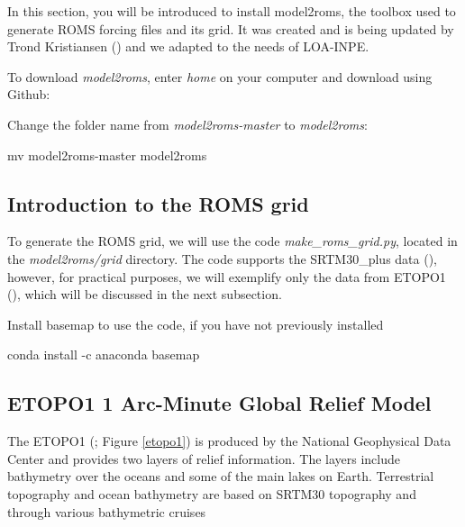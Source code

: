 \noindent In this section, you will be introduced to install model2roms, the toolbox used to generate ROMS forcing files and its grid. 
It was created and is being updated by Trond Kristiansen (\textcolor{bleu_cite}{\cite{Trond2019}}) and we adapted to the needs of 
LOA-INPE. 
\bigskip

\noindent To download \textit{model2roms}, enter \textit{home} on your computer and download using Github:
\bigskip

\bigskip

\noindent Change the folder name from \textit{model2roms-master} to \textit{model2roms}:
\bigskip

\begin{bashcode}
mv model2roms-master model2roms
\end{bashcode}
\bigskip

\subsection{Introduction to the ROMS grid}
\bigskip

\noindent To generate the ROMS grid, we will use the code \textit{make\_roms\_grid.py}, located in the \textit{model2roms/grid} 
directory. The code supports the SRTM30\_plus data (\cite{Becker2009}), however, for practical purposes, we will exemplify 
only the data from ETOPO1 (\cite{Amante2009}), which will be discussed in the next subsection.
\bigskip

\noindent Install basemap to use the code, if you have not previously installed
\bigskip

\begin{bashcode}
conda install -c anaconda basemap
\end{bashcode}
\bigskip

\subsection{ETOPO1 1 Arc-Minute Global Relief Model}
\bigskip

\noindent The ETOPO1 (\cite{Amante2009}; Figure \textcolor{bleu_cite}{\ref{etopo1}}) 
is produced by the National Geophysical Data Center and provides two layers of relief information.
The layers include bathymetry over the oceans and some of the main lakes on Earth.
 Terrestrial topography and ocean bathymetry are based on SRTM30 topography and through various bathymetric cruises
\bigskip

